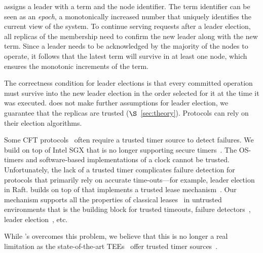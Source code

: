 \projecttitle{} assigns a leader with a term and the node identifier. The term identifier can be seen as an \emph{epoch}, a monotonically increased number that uniquely identifies the current view of the system. To continue serving requests after a leader election, all replicas of the membership need to confirm the new leader along with the new term. Since a leader needs to be acknowledged by the majority of the nodes to operate, it follows that the latest term will survive in at least one node, which ensures the monotonic increments of the term.

 The correctness condition for leader elections is that every committed operation must survive into the new leader election in the order selected for it at the time it was executed. \projecttitle{} does not make further assumptions for leader election, we guarantee that the replicas are trusted ($\S$~\ref{sec:theory}). Protocols can rely on their election algorithms. %

 Some CFT protocols~\cite{raft, chain-replication} often require a trusted timer source to detect failures. We build \projecttitle{} on top of Intel SGX that is no longer supporting secure timers~\cite{monotoniccounterssgx, sgxtrustedtime}. The OS-timers and software-based implementations of a clock cannot be trusted. %
Unfortunately, the lack of a trusted timer complicates failure detection for protocols that primarily rely on accurate time-outs---for example, leader election in Raft. \projecttitle{} builds on top of \scone{} that implements a trusted lease mechanism~\cite{t-lease}. Our mechanism supports all the  properties of classical leases~\cite{10.1145/74850.74870} in untrusted environments that is the building block for trusted timeouts, failure detectors~\cite{222603}, leader election~\cite{815321}, etc.

While \projecttitle{}'s overcomes this problem, we believe that this is no longer a real limitation as the state-of-the-art TEEs~\cite{intelTDX, amd-sev} offer trusted timer sources~\cite{intelTSC, amdTSC}. %



